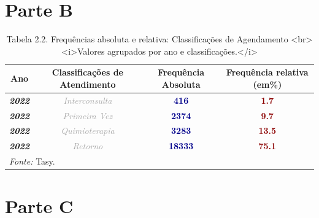 \documentclass[
  letterpaper,
  DIV=11,
  numbers=noendperiod]{scrreprt}
\begin{document}
\section{Parte B}

\begin{table}
\centering
\caption{Tabela 2.2. Frequências absoluta e relativa: Classificações de Agendamento  <br><i>Valores agrupados por ano e classificações.</i>}
\centering
\begin{tabular}[t]{>{}c|>{}c|>{}c|>{}c}
\hline
Ano & Classificações de Atendimento & Frequência Absoluta & Frequência relativa (em\%)\\
\hline
\textcolor{black}{\em{\textbf{2022}}} & \textcolor{darkgray}{\em{Interconsulta}} & \textcolor{darkblue}{\textbf{416}} & \textcolor{darkred}{\textbf{1.7}}\\
\hline
\textcolor{black}{\em{\textbf{2022}}} & \textcolor{darkgray}{\em{Primeira Vez}} & \textcolor{darkblue}{\textbf{2374}} & \textcolor{darkred}{\textbf{9.7}}\\
\hline
\textcolor{black}{\em{\textbf{2022}}} & \textcolor{darkgray}{\em{Quimioterapia}} & \textcolor{darkblue}{\textbf{3283}} & \textcolor{darkred}{\textbf{13.5}}\\
\hline
\textcolor{black}{\em{\textbf{2022}}} & \textcolor{darkgray}{\em{Retorno}} & \textcolor{darkblue}{\textbf{18333}} & \textcolor{darkred}{\textbf{75.1}}\\
\hline
\multicolumn{4}{l}{\rule{0pt}{1em}\textit{Fonte: } Tasy.}\\
\end{tabular}
\end{table}

\section{Parte C}
\end{document}
